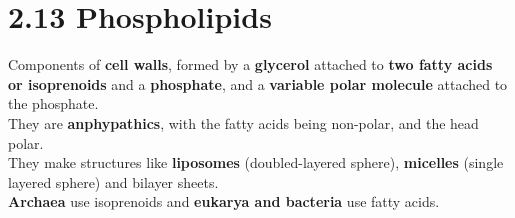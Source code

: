 \documentclass[a4paper,landscape,10pt]{cheatsheet}
\begin{document}
\section*{2.13 Phospholipids}
Components of \textbf{cell walls}, formed by a \textbf{glycerol} attached to \textbf{two fatty acids or isoprenoids} and a \textbf{phosphate}, and a \textbf{variable polar
  molecule} attached to the phosphate.\\
\medskip
They are \textbf{anphypathics}, with the fatty acids being non-polar, and the head polar.\\
\medskip
They make structures like \textbf{liposomes} (doubled-layered sphere), \textbf{micelles} (single layered sphere) and
bilayer sheets.\\
\medskip
\textbf{Archaea} use isoprenoids and \textbf{eukarya and bacteria} use fatty acids.
\end{document}
